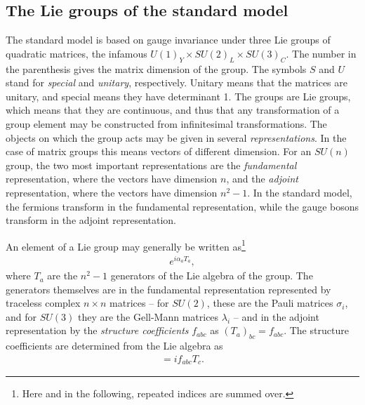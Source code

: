 \documentclass[twoside,english]{uiofysmaster}
\begin{document}
\subsection{The Lie groups of the standard model}

The standard model is based on gauge invariance under three Lie groups of quadratic matrices, the infamous $U(1)_Y\times SU(2)_L\times SU(3)_C$. The number in the parenthesis gives the matrix dimension of the group. The symbols $S$ and $U$ stand for {\it special} and {\it unitary}, respectively. Unitary means that the matrices are unitary, and special means they have determinant 1. The groups are Lie groups, which means that they are continuous, and thus that any transformation of a group element may be constructed from infinitesimal transformations. The objects on which the group acts may be given in several {\it representations}. In the case of matrix groups this means vectors of different dimension. For an $SU(n)$ group, the two most important representations are the {\it fundamental} representation, where the vectors have dimension $n$, and the {\it adjoint} representation, where the vectors have dimension $n^2-1$. In the standard model, the fermions transform in the fundamental representation, while the gauge bosons transform in the adjoint representation.

An element of a Lie group may generally be written as\footnote{Here and in the following, repeated indices are summed over.} 
\begin{align}
	e^{i\alpha_a T_a},
\end{align}
where $T_a$ are the $n^2-1$ generators of the Lie algebra of the group. The generators themselves are in the fundamental representation represented by traceless complex $n\times n$ matrices -- for $SU(2)$, these are the Pauli matrices $\sigma_i$, and for $SU(3)$ they are the Gell-Mann matrices $\lambda_i$ -- and in the adjoint representation by the {\it structure coefficients} $f_{abc}$ as $(T_a)_{bc} = f_{abc}$. The structure coefficients are determined from the Lie algebra as
\begin{align}
	[T_a, T_b] = i f_{abc}T_c.
\end{align}
\end{document}

